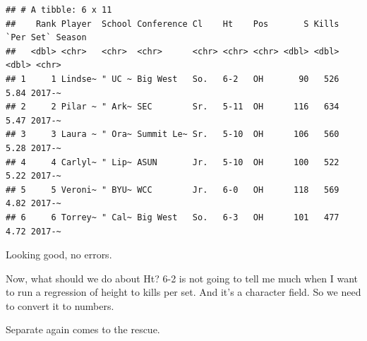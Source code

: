 \documentclass[
]{book}
\begin{document}
\begin{verbatim}
## # A tibble: 6 x 11
##    Rank Player  School Conference Cl    Ht    Pos       S Kills `Per Set` Season
##   <dbl> <chr>   <chr>  <chr>      <chr> <chr> <chr> <dbl> <dbl>     <dbl> <chr> 
## 1     1 Lindse~ " UC ~ Big West   So.   6-2   OH       90   526      5.84 2017-~
## 2     2 Pilar ~ " Ark~ SEC        Sr.   5-11  OH      116   634      5.47 2017-~
## 3     3 Laura ~ " Ora~ Summit Le~ Sr.   5-10  OH      106   560      5.28 2017-~
## 4     4 Carlyl~ " Lip~ ASUN       Jr.   5-10  OH      100   522      5.22 2017-~
## 5     5 Veroni~ " BYU~ WCC        Jr.   6-0   OH      118   569      4.82 2017-~
## 6     6 Torrey~ " Cal~ Big West   So.   6-3   OH      101   477      4.72 2017-~
\end{verbatim}

Looking good, no errors.

Now, what should we do about Ht? 6-2 is not going to tell me much when I want to run a regression of height to kills per set. And it's a character field. So we need to convert it to numbers.

Separate again comes to the rescue.
\end{document}
